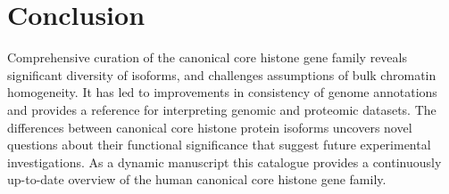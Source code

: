 \section{Conclusion}
\label{sec:conclusion}

  Comprehensive curation of the canonical core histone gene family
  reveals significant diversity of isoforms,
  and challenges assumptions of bulk chromatin homogeneity.
  It has led to improvements in consistency of genome annotations
  and provides a reference for interpreting genomic and proteomic datasets.
  The differences between canonical core histone protein isoforms
  uncovers novel questions about their functional significance
  that suggest future experimental investigations.
  As a dynamic manuscript this catalogue provides a continuously up-to-date overview
  of the human canonical core histone gene family.
